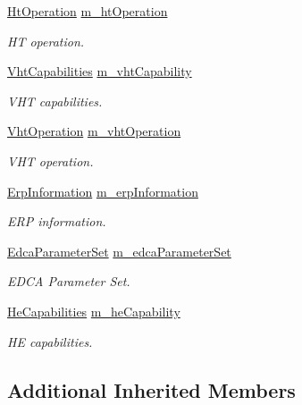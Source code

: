 \begin{DoxyCompactItemize}
\hyperlink{classns3_1_1HtOperation}{Ht\+Operation} \hyperlink{classns3_1_1MgtAssocResponseHeader_a43cf48ffb3819ac01d50743dd8b3f5b0}{m\+\_\+ht\+Operation}
\begin{DoxyCompactList}\small\item\em HT operation. \end{DoxyCompactList}\item 
\hyperlink{classns3_1_1VhtCapabilities}{Vht\+Capabilities} \hyperlink{classns3_1_1MgtAssocResponseHeader_a66471f228d5c15f66958c369197057e5}{m\+\_\+vht\+Capability}
\begin{DoxyCompactList}\small\item\em V\+HT capabilities. \end{DoxyCompactList}\item 
\hyperlink{classns3_1_1VhtOperation}{Vht\+Operation} \hyperlink{classns3_1_1MgtAssocResponseHeader_a278be81f97bb87d233df3ee9f7f9882a}{m\+\_\+vht\+Operation}
\begin{DoxyCompactList}\small\item\em V\+HT operation. \end{DoxyCompactList}\item 
\hyperlink{classns3_1_1ErpInformation}{Erp\+Information} \hyperlink{classns3_1_1MgtAssocResponseHeader_a28551f55f902a75fd5434340d52c0356}{m\+\_\+erp\+Information}
\begin{DoxyCompactList}\small\item\em E\+RP information. \end{DoxyCompactList}\item 
\hyperlink{classns3_1_1EdcaParameterSet}{Edca\+Parameter\+Set} \hyperlink{classns3_1_1MgtAssocResponseHeader_a435296135d8636a5bef9b8d6c3826e56}{m\+\_\+edca\+Parameter\+Set}
\begin{DoxyCompactList}\small\item\em E\+D\+CA Parameter Set. \end{DoxyCompactList}\item 
\hyperlink{classns3_1_1HeCapabilities}{He\+Capabilities} \hyperlink{classns3_1_1MgtAssocResponseHeader_a4be4a37798cf987d629a491b70555fca}{m\+\_\+he\+Capability}
\begin{DoxyCompactList}\small\item\em HE capabilities. \end{DoxyCompactList}\end{DoxyCompactItemize}
\subsection*{Additional Inherited Members}


